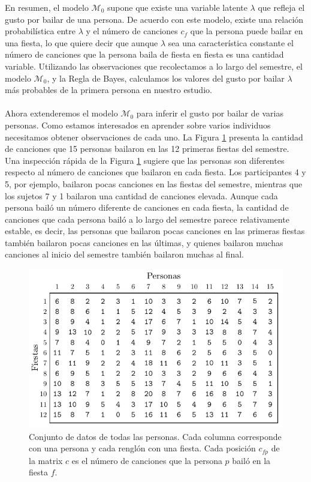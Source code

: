 \documentclass{article}
\begin{document}
\indent En resumen, el modelo $\mathcal M_0$ supone que existe una variable latente $\lambda$ que refleja el gusto por bailar de una persona. De acuerdo con este modelo, existe una relación probabilística entre $\lambda$ y el número de canciones $c_f$ que la persona puede bailar en una fiesta, lo que quiere decir que aunque $\lambda$ sea una característica constante el número de canciones que la persona baila de fiesta en fiesta es una cantidad variable. Utilizando las observaciones que recolectamos a lo largo del semestre, el modelo $\mathcal M_0$, y la Regla de Bayes, calculamos los valores del gusto por bailar $\lambda$ más probables de la primera persona en nuestro estudio.\\\\
\indent Ahora extenderemos el modelo $\mathcal M_0$ para inferir el gusto por bailar de varias personas. Como estamos interesados en aprender sobre varios individuos necesitamos obtener observaciones de cada uno. La Figura \ref{fig:data} presenta la cantidad de canciones que 15 personas bailaron en las 12 primeras fiestas del semestre.\\
\indent Una inspección rápida de la Figura \ref{fig:data} sugiere que las personas son diferentes respecto al número de canciones que bailaron en cada fiesta. Los participantes 4 y 5, por ejemplo, bailaron pocas canciones en las fiestas del semestre, mientras que los sujetos 7 y 1 bailaron una cantidad de canciones elevada. Aunque cada persona bailó un número diferente de canciones en cada fiesta, la cantidad de canciones que cada persona bailó a lo largo del semestre parece relativamente estable, es decir, las personas que bailaron pocas canciones en las primeras fiestas también bailaron pocas canciones en las últimas, y quienes bailaron muchas canciones al inicio del semestre también bailaron muchas al final.\\

\begin{figure}[H]
\centering
\setlength\fboxsep{0pt}
\setlength\fboxrule{0.5pt}
\includegraphics[trim=0cm 0cm 0cm 0cm, clip=true, width=1\textwidth]	{data_1.pdf}
\caption{Conjunto de datos de todas las personas. Cada columna corresponde con una persona y cada renglón con una fiesta. Cada posición $c_{fp}$ de la matrix $c$ es el número de canciones que la persona $p$ bailó en la fiesta $f$.}
\label{fig:data}
\end{figure}
\end{document}
